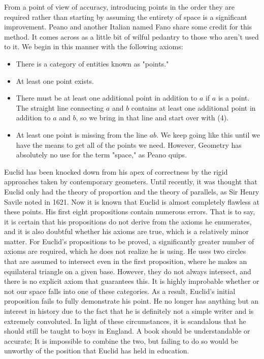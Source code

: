 \documentclass[a4paper,12pt]{book}[2004/02/16]
\theoremstyle{ilemma}
\theoremstyle{itheorem}
\theoremstyle{iother}
\theoremstyle{icorollary}
\theoremstyle{numcorollary}
\theoremstyle{idefinition}
\begin{document}
From a point of view of accuracy, introducing points in the order they are required rather than starting by assuming the entirety of space is a significant improvement. Peano and another Italian named Fano share some credit for this method. It comes across as a little bit of wilful pedantry to those who aren't used to it. We begin in this manner with the following axioms:
\begin{itemize}
\item There is a category of entities known as "points." 
\item At least one point exists. 
\item There must be at least one additional point in addition to $a$ if $a$ is a point. The straight line connecting $a$ and $b$ contains at least one additional point in addition to $a$ and $b$, so we bring in that line and start over with (4). 
\item At least one point is missing from the line $ab$. We keep going like this until we have the means to get all of the points we need. However, Geometry has absolutely no use for the term "space," as Peano quips.
\end{itemize}
Euclid has been knocked down from his apex of correctness by the rigid approaches taken by contemporary geometers. Until recently, it was thought that Euclid only had the theory of proportion and the theory of parallels, as Sir Henry Savile noted in 1621. Now it is known that Euclid is almost completely flawless at these points. His first eight propositions contain numerous errors. That is to say, it is certain that his propositions do not derive from the axioms he enumerates, and it is also doubtful whether his axioms are true, which is a relatively minor matter. For Euclid's propositions to be proved, a significantly greater number of axioms are required, which he does not realize he is using.
He uses two circles that are assumed to intersect even in the first proposition, where he makes an equilateral triangle on a given base. However, they do not always intersect, and there is no explicit axiom that guarantees this. It is highly improbable whether or not our space falls into one of these categories.
As a result, Euclid's initial proposition fails to fully demonstrate his point. He no longer has anything but an interest in history due to the fact that he is definitely not a simple writer and is extremely convoluted. In light of these circumstances, it is scandalous that he should still be taught to boys in England. A book should be understandable or accurate; It is impossible to combine the two, but failing to do so would be unworthy of the position that Euclid has held in education.
\end{document}
